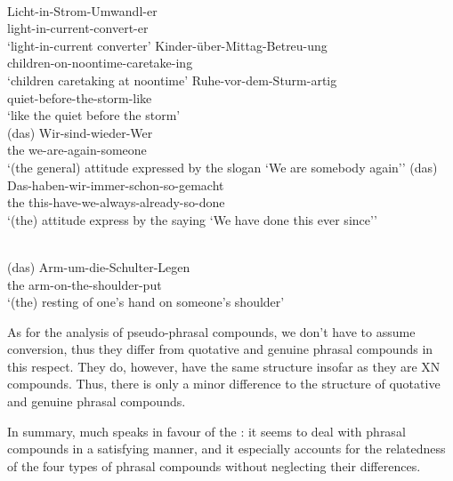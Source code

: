 \documentclass[output=paper]{LSP/langsci}
\begin{document}
\ea\label{ex:pafel:40}
      \\
      \ea\label{ex:pafel:40a}      
      \gll  Licht-in-Strom-Umwandl-er  \\
            light-in-current-convert-er \\
      \glt  `light-in-current converter'
      \ex\label{ex:pafel:40b}
      \gll   Kinder-über-Mittag-Betreu-ung\\
             children-on-noontime-caretake-ing  \\
      \glt  `children caretaking at noontime'
      \ex\label{ex:pafel:40c}
      \gll   Ruhe-vor-dem-Sturm-artig   \\
             quiet-before-the-storm-like  \\
      \glt  `like the quiet before the storm' 
   \z
\z
   \newpage
\ea\label{ex:pafel:41}
      \\
      \ea\label{ex:pafel:41a}      
      \gll  (das) Wir-sind-wieder-Wer\\
            the we-are-again-someone  \\
      \glt  `(the general) attitude expressed by the slogan `We are somebody again''
      \ex\label{ex:pafel:41b}
      \gll   (das) Das-haben-wir-immer-schon-so-gemacht \\
             the this-have-we-always-already-so-done \\
      \glt  `(the) attitude express by the saying `We have done this ever since''
    \z
\z
   
\ea\label{ex:pafel:42}
      \\      
      \gll  (das) Arm-um-die-Schulter-Legen  \\
            the arm-on-the-shoulder-put  \\
      \glt  `(the) resting of one's hand on someone's shoulder'
\z
      
As for the analysis of pseudo-phrasal compounds, we don't have to assume conversion, thus they differ from quotative and genuine phrasal compounds in this respect. They do, however, have the same structure insofar as they are XN compounds. Thus, there is only a minor difference to the structure of quotative and genuine phrasal compounds. 
 
In summary, much speaks in favour of the : it seems to deal with phrasal compounds in a satisfying manner, and it especially accounts for the relatedness of the four types of phrasal compounds without neglecting their differences.
\end{document}
